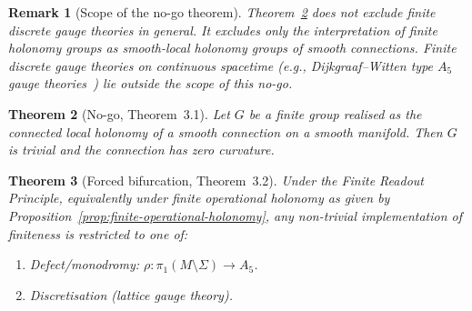 \documentclass[sn-mathphys-num,Numbered]{sn-jnl}
\theoremstyle{thmstyleone}
\newtheorem{theorem}{Theorem}[section]
\theoremstyle{thmstylethree}
\theoremstyle{thmstyletwo}
\newtheorem{remark}[theorem]{Remark}
\begin{document}
\begin{remark}[Scope of the no-go theorem]
Theorem~\ref{thm:nogo} does not exclude finite discrete gauge theories in
general.  It excludes only the interpretation of finite holonomy groups
as \emph{smooth-local} holonomy groups of smooth connections.  Finite
discrete gauge theories on continuous spacetime (e.g., Dijkgraaf--Witten
type $A_5$ gauge theories~\cite{DW1990}) lie outside the scope of this
no-go.
\end{remark}

\begin{theorem}[No-go, Theorem~3.1]
\label{thm:nogo}
Let $G$ be a finite group realised as the connected local holonomy of a
smooth connection on a smooth manifold.  Then $G$ is trivial and the
connection has zero curvature.
\end{theorem}

\begin{theorem}[Forced bifurcation, Theorem~3.2]
\label{thm:bifurcation}
Under the Finite Readout Principle, equivalently under finite
operational holonomy as given by
Proposition~\ref{prop:finite-operational-holonomy}, any non-trivial
implementation of finiteness is restricted to one of:
\begin{enumerate}
  \item[(A)] Defect/monodromy: $\rho:\pi_1(M\setminus\Sigma)\to A_5$.
  \item[(B)] Discretisation (lattice gauge theory).
\end{enumerate}
\end{theorem}
\end{document}
